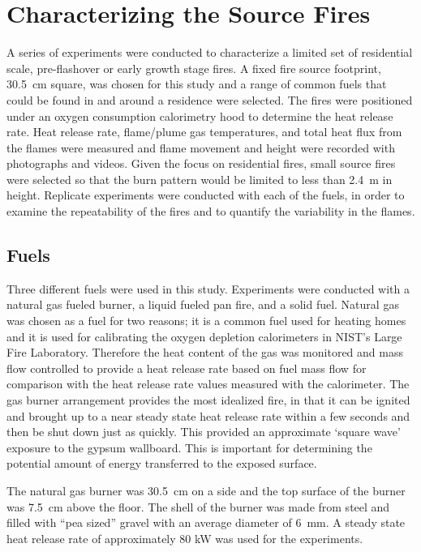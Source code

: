 \documentclass[twoside]{uocthesis}
\begin{document}
{\chapter{Characterizing the Source Fires}
\label{chapter:Characterizing the Source Fires}

A series of experiments were conducted to characterize a limited set of  residential scale, pre-flashover or early growth stage fires.  A fixed fire source footprint, 30.5~cm square, was chosen for this study and a range of common fuels that could be found in and around a residence were selected.  The fires were positioned under an oxygen consumption calorimetry hood to determine the heat release rate.  Heat release rate, flame/plume gas temperatures, and total heat flux from the flames were measured and flame movement and height were recorded with photographs and videos.  Given the focus on residential fires, small source fires were selected so that the burn pattern would be limited to less than 2.4~m in height.  Replicate experiments were conducted with each of the fuels, in order to examine the repeatability of the fires and to quantify the variability in the flames.

\section{Fuels}

Three different fuels were used in this study.  Experiments were conducted with a natural gas fueled burner, a liquid fueled pan fire, and a solid fuel. Natural gas was chosen as a fuel for two reasons; it is a common fuel used for heating homes and it is used for calibrating the oxygen depletion calorimeters in NIST’s Large Fire Laboratory.  Therefore the heat content of the gas was monitored and mass flow controlled to provide a heat release rate based on fuel mass flow for comparison with the heat release rate values measured with the calorimeter.  The gas burner arrangement provides the most idealized fire, in that it can be ignited and brought up to a near steady state heat release rate within a few seconds and then be shut down just as quickly.  This provided an approximate `square wave' exposure to the gypsum wallboard.  This is important for determining the potential amount of energy transferred to the exposed surface.

The natural gas burner was 30.5~cm on a side and the top surface of the burner was 7.5~cm above the floor. The shell of the burner was made from steel and filled with ``pea sized'' gravel with an average diameter of 6~mm.  A steady state heat release rate of approximately 80 kW was used for the experiments.

}
\end{document}
